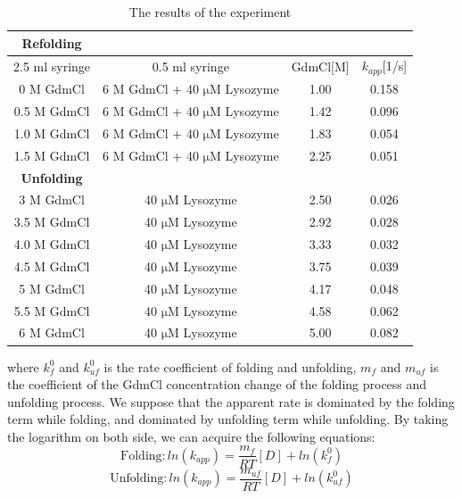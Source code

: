 \documentclass[a4paper,english,12pt,bibliography=totoc]{scrreprt}
\begin{document}
\begin{table}[H]
    \centering
    \begin{tabular}{c|c|c|c}
        \textbf{Refolding}\\
        \hline
        2.5 ml syringe &0.5 ml syringe& GdmCl[M]&$k_{app}$[1/s]  \\
        \hline
        0 M GdmCl &6 M GdmCl + 40 $\mathrm{\mu}$M Lysozyme &1.00 &0.158 \\
        \hline
        0.5 M GdmCl &6 M GdmCl + 40 $\mathrm{\mu}$M Lysozyme &1.42 &0.096\\
        \hline
        1.0 M GdmCl &6 M GdmCl + 40 $\mathrm{\mu}$M Lysozyme &1.83 &0.054\\
        \hline
        1.5 M GdmCl &6 M GdmCl + 40 $\mathrm{\mu}$M Lysozyme &2.25 &0.051\\
        \hline
        \textbf{Unfolding}\\
        \hline
        3 M GdmCl &40 $\mathrm{\mu}$M Lysozyme &2.50 & 0.026\\
        \hline
        3.5 M GdmCl &40 $\mathrm{\mu}$M Lysozyme &2.92 &0.028\\
        \hline
        4.0 M GdmCl &40 $\mathrm{\mu}$M Lysozyme &3.33 &0.032\\
        \hline
        4.5 M GdmCl &40 $\mathrm{\mu}$M Lysozyme &3.75 &0.039\\
        \hline
        5 M GdmCl &40 $\mathrm{\mu}$M Lysozyme &4.17 &0.048\\
        \hline
        5.5 M GdmCl &40 $\mathrm{\mu}$M Lysozyme &4.58 &0.062\\
        \hline
        6 M GdmCl &40 $\mathrm{\mu}$M Lysozyme & 5.00&0.082\\
        \hline
    \end{tabular}
    \caption{The results of the experiment}
    \label{tab:my_label}
\end{table}


where $k^0_f$ and $k^0_{uf}$ is the rate coefficient of folding and unfolding, $m_f$ and $m_{uf}$ is the coefficient of the GdmCl concentration change of the folding process and unfolding process. We suppose that the apparent rate is dominated by the folding term while folding, and dominated by unfolding term while unfolding. By taking the logarithm on both side, we can acquire the following equations:
\[
\mathrm{Folding: } ln(k_{app}) = \frac{m_f}{RT}[D] + ln(k_f^0)
\]
\[
\mathrm{Unfolding: } ln(k_{app}) = \frac{m_{uf}}{RT}[D] + ln(k_{uf}^0)
\]
\end{document}
